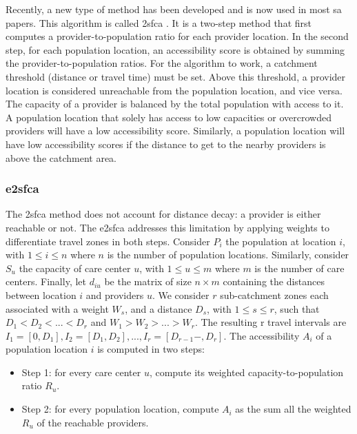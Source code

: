 Recently, a new type of method has been developed and is now used in most
\ac{sa} papers. This algorithm is called \ac{2sfca} \cite{luo_using_2004}. It is
a two-step method that first computes a provider-to-population ratio for each
provider location. In the second step, for each population location, an
accessibility score is obtained by summing the provider-to-population ratios.
For the algorithm to work, a catchment threshold (distance or travel time) must
be set. Above this threshold, a provider location is considered unreachable from
the population location, and vice versa. The capacity of a provider is
balanced by the total population with access to it. A population location that
solely has access to low capacities or overcrowded providers will have a low
accessibility score. Similarly, a population location will have low
accessibility scores if the distance to get to the nearby providers is
above the catchment area.

\subsubsection{\acf{e2sfca}}

The \ac{2sfca} method does not account for distance decay: a provider is either
reachable or not. The \ac{e2sfca} \cite{luo_enhanced_2009} addresses this
limitation by applying weights to differentiate travel zones in both steps.
Consider $P_i$ the population at location $i$, with $1 \leq i \leq n$ where $n$
is the number of population locations. Similarly, consider $S_u$ the capacity of
care center $u$, with $1 \leq u \leq m$ where $m$ is the number of care centers.
Finally, let $d_{iu}$ be the matrix of size $n \times m$ containing the
distances between location $i$ and providers $u$. We consider $r$ sub-catchment
zones each associated with a weight $W_s$, and a distance $D_s$, with $1 \leq s
    \leq r$, such that $D_1 < D_2 < ... < D_r$ and $W_1 > W_2 > ... > W_r$. The
resulting r travel intervals are $I_1=[0, D_1], I_2=[D_1, D_2 ], ...
    ,I_r=[D_{r-1}-,D_r]$. The accessibility $A_i$ of a population location $i$ is
computed in two steps:

\begin{itemize}
    \item Step 1: for every care center $u$, compute its weighted
          capacity-to-population ratio $R_u$.
    \item Step 2: for every population location, compute $A_i$ as the sum all
          the weighted $R_u$ of the reachable providers.
\end{itemize}

